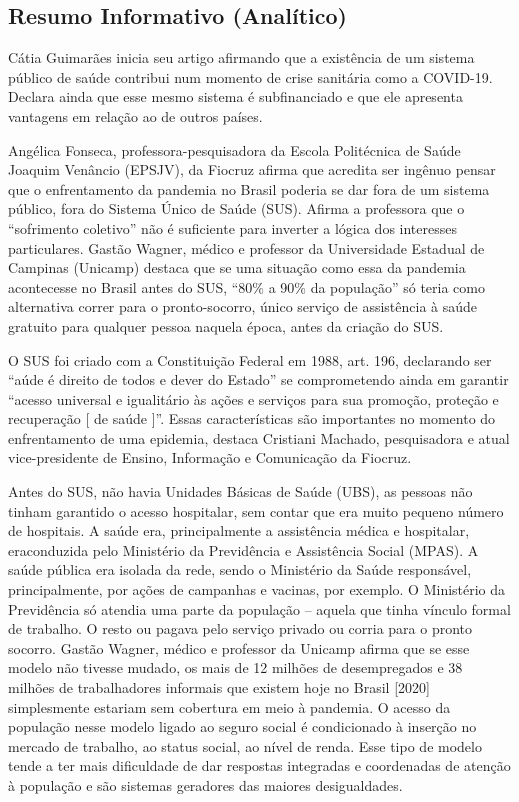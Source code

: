 \documentclass[
]{book}
\begin{document}
\hypertarget{resumo-informativo-analuxedtico}{%
\subsection{Resumo Informativo
(Analítico)}\label{resumo-informativo-analuxedtico}}

Cátia Guimarães inicia seu artigo afirmando que a existência de um
sistema público de saúde contribui num momento de crise sanitária como a
COVID-19. Declara ainda que esse mesmo sistema é subfinanciado e que ele
apresenta vantagens em relação ao de outros países.

Angélica Fonseca, professora-pesquisadora da Escola Politécnica de Saúde
Joaquim Venâncio (EPSJV), da Fiocruz afirma que acredita ser ingênuo
pensar que o enfrentamento da pandemia no Brasil poderia se dar fora de
um sistema público, fora do Sistema Único de Saúde (SUS). Afirma a
professora que o ``sofrimento coletivo'' não é suficiente para inverter
a lógica dos interesses particulares. Gastão Wagner, médico e professor
da Universidade Estadual de Campinas (Unicamp) destaca que se uma
situação como essa da pandemia acontecesse no Brasil antes do SUS,
``80\% a 90\% da população'' só teria como alternativa correr para o
pronto-socorro, único serviço de assistência à saúde gratuito para
qualquer pessoa naquela época, antes da criação do SUS.

O SUS foi criado com a Constituição Federal em 1988, art. 196,
declarando ser ``aúde é direito de todos e dever do Estado'' se
comprometendo ainda em garantir ``acesso universal e igualitário às
ações e serviços para sua promoção, proteção e recuperação {[} de saúde
{]}''. Essas características são importantes no momento do enfrentamento
de uma epidemia, destaca Cristiani Machado, pesquisadora e atual
vice-presidente de Ensino, Informação e Comunicação da Fiocruz.

Antes do SUS, não havia Unidades Básicas de Saúde (UBS), as pessoas não
tinham garantido o acesso hospitalar, sem contar que era muito pequeno
número de hospitais. A saúde era, principalmente a assistência médica e
hospitalar, eraconduzida pelo Ministério da Previdência e Assistência
Social (MPAS). A saúde pública era isolada da rede, sendo o Ministério
da Saúde responsável, principalmente, por ações de campanhas e vacinas,
por exemplo. O Ministério da Previdência só atendia uma parte da
população -- aquela que tinha vínculo formal de trabalho. O resto ou
pagava pelo serviço privado ou corria para o pronto socorro. Gastão
Wagner, médico e professor da Unicamp afirma que se esse modelo não
tivesse mudado, os mais de 12 milhões de desempregados e 38 milhões de
trabalhadores informais que existem hoje no Brasil {[}2020{]}
simplesmente estariam sem cobertura em meio à pandemia. O acesso da
população nesse modelo ligado ao seguro social é condicionado à inserção
no mercado de trabalho, ao status social, ao nível de renda. Esse tipo
de modelo tende a ter mais dificuldade de dar respostas integradas e
coordenadas de atenção à população e são sistemas geradores das maiores
desigualdades.
\end{document}
